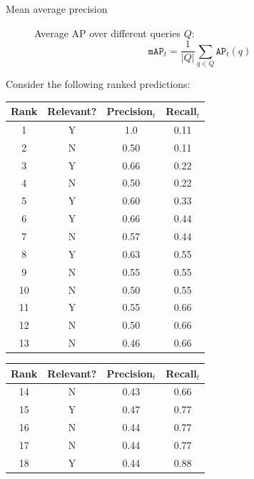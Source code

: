 \begin{description}
        \begin{description}
            \item[Mean average precision] 
                Average AP over different queries $Q$:
                \[ \texttt{mAP}_t = \frac{1}{|Q|} \sum_{q \in Q} \texttt{AP}_t(q) \]
        \end{description}
\end{description}

\begin{example}
    Consider the following ranked predictions:
    \begin{table}[H]
        \centering
        \footnotesize
        \begin{tabular}[t]{cccc}
            \toprule
            \textbf{Rank} & \textbf{Relevant?} & \textbf{Precision}$_t$ & \textbf{Recall}$_t$ \\
            \midrule
            1  & Y & 1.0 & 0.11 \\
            2  & N & 0.50 & 0.11 \\
            3  & Y & 0.66 & 0.22 \\
            4  & N & 0.50 & 0.22 \\
            5  & Y & 0.60 & 0.33 \\
            6  & Y & 0.66 & 0.44 \\
            7  & N & 0.57 & 0.44 \\
            8  & Y & 0.63 & 0.55 \\
            9  & N & 0.55 & 0.55 \\
            10 & N & 0.50 & 0.55 \\
            11 & Y & 0.55 & 0.66 \\
            12 & N & 0.50 & 0.66 \\
            13 & N & 0.46 & 0.66 \\
            \bottomrule
        \end{tabular}
        \quad
        \begin{tabular}[t]{cccc}
            \toprule
            \textbf{Rank} & \textbf{Relevant?} & \textbf{Precision}$_t$ & \textbf{Recall}$_t$ \\
            \midrule
            14 & N & 0.43 & 0.66 \\
            15 & Y & 0.47 & 0.77 \\
            16 & N & 0.44 & 0.77 \\
            17 & N & 0.44 & 0.77 \\
            18 & Y & 0.44 & 0.88 \\

\end{tabular}
\end{table}
\end{example}

